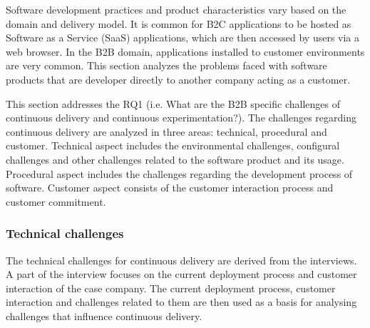 \documentclass[english, grading]{tktltiki2}
\theoremstyle{definition}
\theoremstyle{remark}
\begin{document}
Software development practices and product characteristics vary based on the domain and delivery model. It is common for B2C applications to be hosted as Software as a Service (SaaS) applications, which are then accessed by users via a web browser. In the B2B domain, applications installed to customer environments are very common. This section analyzes the problems faced with software products that are developer directly to another company acting as a customer.

This section addresses the RQ1 (i.e. What are the B2B specific challenges of continuous delivery and continuous experimentation?). The challenges regarding continuous delivery are analyzed in three areas: technical, procedural and customer. Technical aspect includes the environmental challenges, configural challenges and other challenges related to the software product and its usage. Procedural aspect includes the challenges regarding the development process of software. Customer aspect consists of the customer interaction process and customer commitment.

\subsubsection{Technical challenges}
The technical challenges for continuous delivery are derived from the interviews. A part of the interview focuses on the current deployment process and customer interaction of the case company. The current deployment process, customer interaction and challenges related to them are then used as a basis for analysing challenges that influence continuous delivery. 
\end{document}
